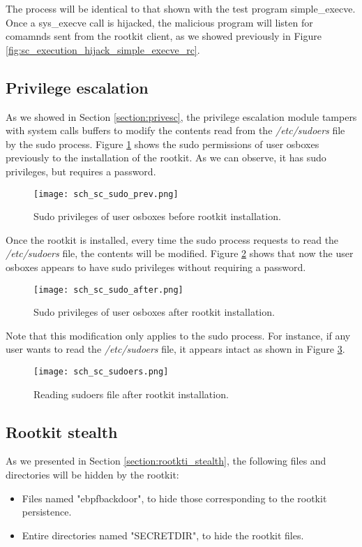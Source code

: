 The process will be identical to that shown with the test program simple\_execve. Once a sys\_execve call is hijacked, the malicious program will listen for comamnds sent from the rootkit client, as we showed previously in Figure \ref{fig:sc_execution_hijack_simple_execve_rc}.


\subsection{Privilege escalation}
As we showed in Section \ref{section:privesc}, the privilege escalation module tampers with system calls buffers to modify the contents read from the \textit{/etc/sudoers} file by the sudo process. Figure \ref{fig:sc_sudo_prev} shows the sudo permissions of user osboxes previously to the installation of the rootkit. As we can observe, it has sudo privileges, but requires a password.

\begin{figure}[htbp]
	\centering
	\texttt{[image: sch\_sc\_sudo\_prev.png]}
	\caption{Sudo privileges of user osboxes before rootkit installation.}
	\label{fig:sc_sudo_prev}
\end{figure}

Once the rootkit is installed, every time the sudo process requests to read the \textit{/etc/sudoers} file, the contents will be modified. Figure \ref{fig:sc_sudo_after} shows that now the user osboxes appears to have sudo privileges without requiring a password.

\begin{figure}[htbp]
	\centering
	\texttt{[image: sch\_sc\_sudo\_after.png]}
	\caption{Sudo privileges of user osboxes after rootkit installation.}
	\label{fig:sc_sudo_after}
\end{figure}

Note that this modification only applies to the sudo process. For instance, if any user wants to read the \textit{/etc/sudoers} file, it appears intact as shown in Figure \ref{fig:sc_sudoers}.

\begin{figure}[htbp]
	\centering
	\texttt{[image: sch\_sc\_sudoers.png]}
	\caption{Reading sudoers file after rootkit installation.}
	\label{fig:sc_sudoers}
\end{figure}

\subsection{Rootkit stealth}
As we presented in Section \ref{section:rootkti_stealth}, the following files and directories will be hidden by the rootkit:
\begin{itemize}
\item Files named "ebpfbackdoor", to hide those corresponding to the rootkit persistence.
\item Entire directories named "SECRETDIR", to hide the rootkit files.
\end{itemize}

